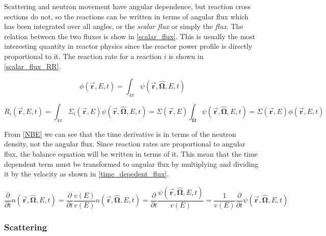 Scattering and neutron movement have angular dependence, but reaction cross sections do not, so the reactions can be written in terms of angular flux which has been integrated over all angles, or the \emph{scalar flux} or simply the \emph{flux}.  The relation between the two fluxes is show in \eqref{scalar_flux}.  This is usually the most interesting quantity in reactor physics since the reactor power profile is directly proportional to it.  The reaction rate for a reaction $i$ is shown in \eqref{scalar_flux_RR}.

\begin{equation}
\label{scalar_flux}
\phi(\boldsymbol{\vec{r}},E,t) = \int_{4\pi} \psi(\boldsymbol{\vec{r}},\boldsymbol{\hat{\Omega}},E,t)
\end{equation}

\begin{equation}
\label{scalar_flux_RR}
 R_i(\boldsymbol{\vec{r}},E,t) = \int_{4\pi} \Sigma_i(\boldsymbol{\vec{r}},E) \psi(\boldsymbol{\vec{r}},\boldsymbol{\hat{\Omega}},E,t) = \Sigma(\boldsymbol{\vec{r}},E) \int_{\boldsymbol{\Omega}} \psi(\boldsymbol{\vec{r}},\boldsymbol{\hat{\Omega}},E,t) = \Sigma(\boldsymbol{\vec{r}},E) \phi(\boldsymbol{\vec{r}},E,t)
 \end{equation}
 
 From \eqref{NBE} we can see that the time derivative is in terms of the neutron density, not the angular flux.  Since reaction rates are proportional to angular flux, the balance equation will be written in terms of it.  This mean that the time dependent term must be transformed to angular flux by multiplying and dividing it by the velocity as shown in \eqref{time_depedent_flux}.

\begin{equation}
\label{time_depedent_flux}
\frac{\partial }{\partial t}n(\boldsymbol{\vec{r}},\boldsymbol{\hat{\Omega}},E,t) = \frac{\partial }{\partial t}  \frac{v(E)}{v(E)} n(\boldsymbol{\vec{r}},\boldsymbol{\hat{\Omega}},E,t) =  \frac{\partial }{\partial t}  \frac{\psi(\boldsymbol{\vec{r}},\boldsymbol{\hat{\Omega}},E,t)}{v(E)} = \frac{1}{v(E)} \frac{\partial }{\partial t}\psi(\boldsymbol{\vec{r}},\boldsymbol{\hat{\Omega}},E,t)
\end{equation}

\subsubsection{Scattering}

